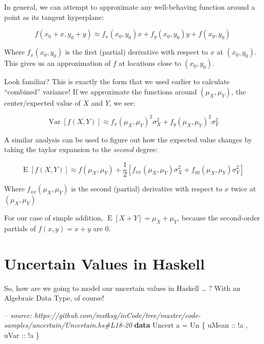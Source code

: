 \documentclass[]{article}
\newenvironment{Shaded}{}{}
\newcommand{\KeywordTok}[1]{\textcolor[rgb]{0.00,0.44,0.13}{\textbf{{#1}}}}
\newcommand{\DataTypeTok}[1]{\textcolor[rgb]{0.56,0.13,0.00}{{#1}}}
\newcommand{\CommentTok}[1]{\textcolor[rgb]{0.38,0.63,0.69}{\textit{{#1}}}}
\newcommand{\OtherTok}[1]{\textcolor[rgb]{0.00,0.44,0.13}{{#1}}}
\newcommand{\FunctionTok}[1]{\textcolor[rgb]{0.02,0.16,0.49}{{#1}}}
\newcommand{\NormalTok}[1]{{#1}}
\begin{document}
In general, we can attempt to approximate any well-behaving function around a
point as its tangent hyperplane:

\[
f(x_0 + x, y_0 + y) \approx f_x(x_0, y_0) x + f_y(x_0, y_0) y + f(x_0, y_0)
\]

Where \(f_x(x_0,y_0)\) is the first (partial) derivative with respect to \(x\)
at \((x_0, y_0)\). This gives us an approximation of \(f\) at locations close to
\((x_0, y_0)\).

Look familiar? This is exactly the form that we used earlier to calculate
``combined'' variance! If we approximate the functions around
\((\mu_X, \mu_Y)\), the center/expected value of \(X\) and \(Y\), we see:

\[
\operatorname{Var}[f(X,Y)] \approx f_x(\mu_X, \mu_Y)^2 \sigma_X^2 + f_y(\mu_X,\mu_Y)^2 \sigma_Y^2
\]

A similar analysis can be used to figure out how the expected value changes by
taking the taylor expansion to the \emph{second} degree:

\[
\operatorname{E}[f(X,Y)] \approx
f(\mu_X, \mu_Y) + \frac{1}{2}
\left[ f_{xx}(\mu_X, \mu_Y) \sigma_X^2 + f_{yy}(\mu_X, \mu_Y) \sigma_Y^2 \right]
\]

Where \(f_{xx}(\mu_X, \mu_Y)\) is the second (partial) derivative with respect
to \(x\) twice at \((\mu_X, \mu_Y)\)

For our case of simple addition, \(\operatorname{E}[X + Y] = \mu_X + \mu_Y\),
because the second-order partials of \(f(x,y) = x + y\) are 0.

\section{Uncertain Values in Haskell}\label{uncertain-values-in-haskell}

So, how are we going to model our uncertain values in Haskell \ldots{} ? With an
Algebraic Data Type, of course!

\begin{Shaded}
\begin{Highlighting}[]
\CommentTok{-- source: https://github.com/mstksg/inCode/tree/master/code-samples/uncertain/Uncertain.hs#L18-20}
\KeywordTok{data} \DataTypeTok{Uncert} \NormalTok{a }\FunctionTok{=} \DataTypeTok{Un} \NormalTok{\{}\OtherTok{ uMean ::} \FunctionTok{!}\NormalTok{a}
                   \NormalTok{,}\OtherTok{ uVar  ::} \FunctionTok{!}\NormalTok{a}
                   \NormalTok{\}}
\end{Highlighting}
\end{Shaded}
\end{document}
